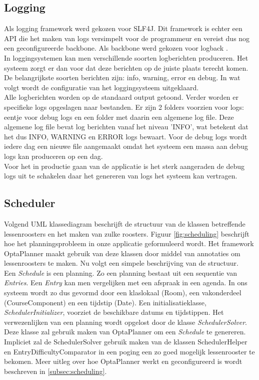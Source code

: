 \subsection{Logging}
\label{subsec:logging}
Als logging framework werd gekozen voor SLF4J\cite{slf4j}.
Dit framework is echter een API die het maken van logs versimpelt voor de programmeur en vereist dus nog een geconfigureerde backbone.
Als backbone werd gekozen voor logback \cite{logback}.\\

In loggingsystemen kan men verschillende soorten logberichten produceren. 
Het systeem zorgt er dan voor dat deze berichten op de juiste plaats terecht komen.
De belangrijkste soorten berichten zijn: info, warning, error en debug.
In wat volgt wordt de configuratie van het loggingsysteem uitgeklaard.\\

Alle logberichten worden op de standaard output getoond.
Verder worden er specifieke logs opgeslagen naar bestanden.
Er zijn 2 folders voorzien voor logs: eentje voor debug logs en een folder met daarin een algemene log file.
Deze algemene log file bevat log berichten vanaf het niveau 'INFO', wat betekent dat het dus INFO, WARNING en ERROR logs bewaart.
Voor de debug logs wordt iedere dag een nieuwe file aangemaakt omdat het systeem een massa aan debug logs kan produceren op een dag.\\

Voor het in productie gaan van de applicatie is het sterk aangeraden de debug logs uit te schakelen daar het genereren van logs het systeem kan vertragen.

\subsection{Scheduler}
\label{subsec:scheduleclass}
Volgend UML klassediagram beschrijft de structuur van de klassen betreffende lessenroosters en het maken van zulke roosters.
Figuur \ref{fig:scheduling} beschrijft hoe het planningsprobleem in onze applicatie geformuleerd wordt.
Het framework OptaPlanner\cite{optaplanner} maakt gebruik van deze klassen door middel van annotaties om lessenroosters te maken.
Nu volgt een simpele beschrijving van de structuur.\\

Een \textit{Schedule} is een planning.
Zo een planning bestaat uit een sequentie van \textit{Entries}.
Een \textit{Entry} kan men vergelijken met een afspraak in een agenda.
In ons systeem wordt zo dus gevormd door een klaslokaal (Room), een vakonderdeel (CourseComponent) en een tijdstip (Date).
Een initialisatieklasse, \textit{SchedulerInitializer}, voorziet de beschikbare datums en tijdstippen.
Het verwezenlijken van een planning wordt opgelost door de klasse \textit{SchedulerSolver}.
Deze klasse zal gebruik maken van OptaPlanner om een \textit{ Schedule} te genereren.
Impliciet zal de SchedulerSolver gebruik maken van de klassen SchedulerHelper en EntryDifficultyComparator in een poging een zo goed mogelijk lessenrooster te bekomen.
Meer uitleg over hoe OptaPlanner werkt en geconfigureerd is wordt beschreven in  \ref{subsec:scheduling}.
 
